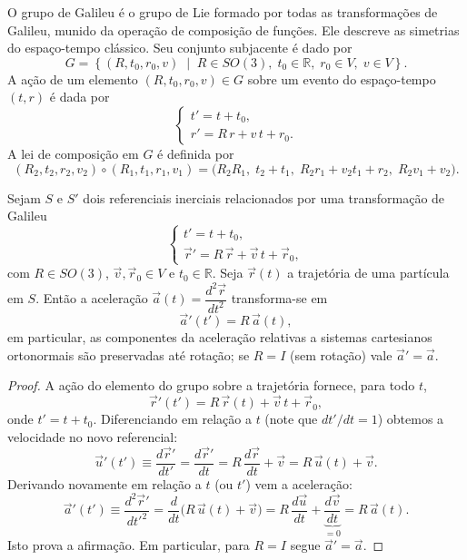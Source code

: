\documentclass[../main]{subfiles}
\begin{document}
\begin{defi}
  O grupo de Galileu é o grupo de Lie formado por todas as transformações de Galileu, munido da operação de composição de funções. Ele descreve as simetrias do espaço-tempo clássico. Seu conjunto subjacente é dado por
  \[
    G = \left\{(R,t_0,r_0,v) \;\middle|\; R \in SO(3),\; t_0 \in \mathbb{R},\; r_0 \in V,\; v \in V \right\}.
  \]
  A ação de um elemento $(R,t_0,r_0,v) \in G$ sobre um evento do espaço-tempo $(t,r)$ é dada por
  \[
    \begin{cases}
      t' = t + t_0, \\
      r' = R\,r + v\,t + r_0.
    \end{cases}
  \]
  A lei de composição em $G$ é definida por
  \[
    (R_2,t_2,r_2,v_2) \circ (R_1,t_1,r_1,v_1)
    =
    \bigl(
      R_2 R_1,\;
      t_2 + t_1,\;
      R_2 r_1 + v_2 t_1 + r_2,\;
      R_2 v_1 + v_2
    \bigr).
  \]
\end{defi}

\begin{prop}
  Sejam \(S\) e \(S'\) dois referenciais inerciais relacionados por uma transformação de Galileu
  \[
    \begin{cases}
      t' = t + t_0,\\[4pt]
      \vec r' = R\,\vec r + \vec v\,t + \vec r_0,
    \end{cases}
  \]
  com \(R\in SO(3)\), \(\vec v,\vec r_0\in V\) e \(t_0\in\mathbb{R}\). Seja \(\vec r(t)\) a trajetória de uma partícula em \(S\). Então a aceleração \(\vec a(t)=\dfrac{d^2\vec r}{dt^2}\) transforma-se em
  \[
    \vec a'(t') = R\,\vec a(t),
  \]
  em particular, as componentes da aceleração relativas a sistemas cartesianos ortonormais são preservadas até rotação; se \(R=I\) (sem rotação) vale \(\vec a'=\vec a\).
\end{prop}

\begin{proof}
  A ação do elemento do grupo sobre a trajetória fornece, para todo \(t\),
  \[
    \vec r'(t') = R\,\vec r(t) + \vec v\,t + \vec r_0,
  \]
  onde \(t'=t+t_0\). Diferenciando em relação a \(t\) (note que \(dt'/dt=1\)) obtemos a velocidade no novo referencial:
  \[
    \vec u'(t') \equiv \frac{d\vec r'}{dt'} = \frac{d\vec r'}{dt}
    = R\,\frac{d\vec r}{dt} + \vec v = R\,\vec u(t) + \vec v.
  \]
  Derivando novamente em relação a \(t\) (ou \(t'\)) vem a aceleração:
  \[
    \vec a'(t') \equiv \frac{d^2\vec r'}{d t'^2} = \frac{d}{dt}\bigl(R\,\vec u(t) + \vec v\bigr)
    = R\,\frac{d\vec u}{dt} + \underbrace{\frac{d\vec v}{dt}}_{=0}
    = R\,\vec a(t).
  \]
  Isto prova a afirmação. Em particular, para \(R=I\) segue \(\vec a'=\vec a\).
\end{proof}
\end{document}
